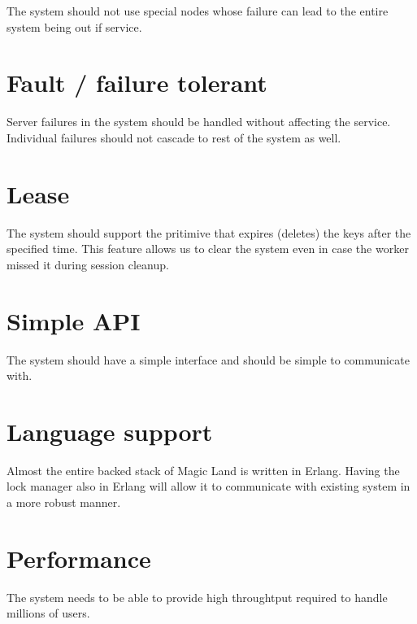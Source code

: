 The system should not use special nodes whose failure can lead to the
entire system being out if service.

\section{Fault / failure tolerant}


Server failures in the system should be handled without affecting the service.
Individual failures should not cascade to rest of the system as well.

\section{Lease}


The system should support the pritimive that expires (deletes) the keys after 
the specified time. This feature allows us to clear the system even in case
the worker missed it during session cleanup.

\section{Simple API}


The system should have a simple interface and should be simple to communicate 
with.

\section{Language support}


Almost the entire backed stack of Magic Land is written in Erlang. Having the
lock manager also in Erlang will allow it to communicate with existing
system in a more robust manner.

\section{Performance}


The system needs to be able to provide high throughtput required to handle
millions of users.

